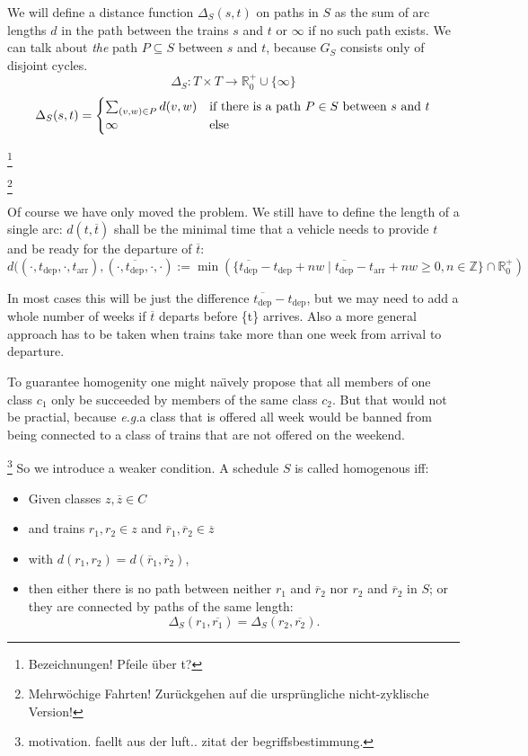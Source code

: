 \documentclass[a4paper]{amsart} %
\def\eg{\emph{e.g.}}
\def\naively{na\"{\i}vely}	%
\newcommand{\ol}[1]{\overline{#1}}
\newcommand{\todo}[1]{\footnote{#1}}
\begin{document}
We will define a distance function \(\Delta_S (s,t)\) on paths in
\(S\) as the sum of arc lengths \(d\) in the path between the
trains \(s\) and \(t\) or \(\infty\) if no such path exists.  We can
talk about \emph{the} path \(P \subseteq S\) between \(s\) and \(t\),
because \(G_S\) consists only of disjoint cycles.
\[\Delta_{S}\colon T \times T \to \mathbb{R}^+_0 \cup \{\infty\}\]
\begin{equation}
\label{defDelta}
\Delta_S (s,t) = \begin{cases}
\sum_{(v,w)\in P} d(v,w) & \textrm{if there is a path \( P \in S\) between \(s\) and \(t\)}\\
\infty & \textrm{else}
\end{cases}
\end{equation}

\todo{Bezeichnungen!  Pfeile über t?}

\todo{Mehrwöchige Fahrten!  Zurückgehen auf die ursprüngliche nicht-zyklische Version!}

Of course we have only moved the problem.  We still have to define the length of a single arc:  \(d(t, \ol{t})\) shall be the minimal time that a vehicle needs to provide \(t\) and be ready for the departure of \(\ol{t}\):
\[
d ((\cdot, t_{\textrm{dep}}, \cdot, t_{\textrm{arr}}), (\cdot, \ol{t_{\textrm{dep}}},\cdot, \cdot)  :=
\min (\{\ol{t_{\textrm{dep}}} - t_{\textrm{dep}} + n w \mid \ol{t_{\textrm{dep}}} - t_{\textrm{arr}} + nw \geq 0, n \in \mathbb{Z}\} \cap \mathbb{R}^+_0)
\]

In most cases this will be just the difference \(\ol{t_{\textrm{dep}}}
- t_{\textrm{dep}}\), but we may need to add a whole number of weeks
if \(\ol{t}\) departs before \{t\} arrives.  Also a more general approach
has to be taken when trains take more than one week from arrival to
departure.

To guarantee homogenity one might \naively{} propose that all members
of one class \(c_1\) only be succeeded by members of the same class
\(c_2\).  But that would not be practial, because \eg a class that is
offered all week would be banned from being connected to a class of trains that
are not offered on the weekend.

\todo{motivation.  faellt aus der luft.. zitat der begriffsbestimmung.}
So we introduce a weaker condition.  A schedule \(S\) is called
homogenous iff:
\begin{itemize}
\item Given classes \(z, \ol{z} \in C\)
\item and trains \(r_1, r_2 \in z\) and \(\ol{r}_1,\ol{r}_2 \in \ol{z}\)
\item with \( d (r_1, r_2) = d(\ol{r}_1, \ol{r}_2) \),
\item then either there is no path between neither \(r_1\) and
  \(\ol{r}_2\) nor \(r_2\) and \(\ol{r}_2\) in \(S\); or they are connected by paths of the same length:
\begin{equation}
\label{homoEq}
  \Delta_S (r_1, \ol{r_1}) = \Delta_S (r_2, \ol{r_2})\textrm{.}
\end{equation}
\end{itemize}
\end{document}
